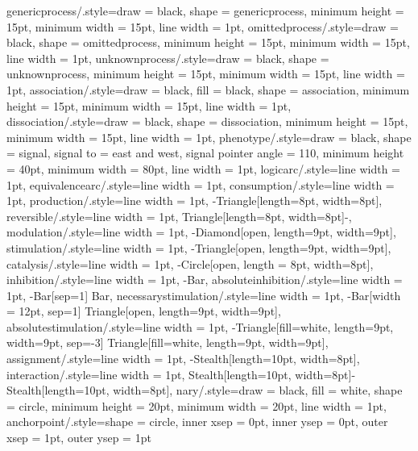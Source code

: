 {    genericprocess/.style={draw = black, shape = genericprocess, minimum height = 15pt, minimum width = 15pt, line width = 1pt},
    omittedprocess/.style={draw = black, shape = omittedprocess, minimum height = 15pt, minimum width = 15pt, line width = 1pt},
    unknownprocess/.style={draw = black, shape = unknownprocess, minimum height = 15pt, minimum width = 15pt, line width = 1pt},
    association/.style={draw = black, fill = black, shape = association, minimum height = 15pt, minimum width = 15pt, line width = 1pt},
    dissociation/.style={draw = black, shape = dissociation, minimum height = 15pt, minimum width = 15pt, line width = 1pt},
    phenotype/.style={draw = black, shape = signal, signal to = east and west, signal pointer angle = 110, minimum height = 40pt, minimum width = 80pt, line width = 1pt},
    logicarc/.style={line width = 1pt},
    equivalencearc/.style={line width = 1pt},
    consumption/.style={line width = 1pt},
    production/.style={line width = 1pt, -{Triangle[length=8pt, width=8pt]}},
    reversible/.style={line width = 1pt, {Triangle[length=8pt, width=8pt]}-},
    modulation/.style={line width = 1pt, -{Diamond[open, length=9pt, width=9pt]}},
    stimulation/.style={line width = 1pt, -{Triangle[open, length=9pt, width=9pt]}},
    catalysis/.style={line width = 1pt, -{Circle[open, length = 8pt, width=8pt]}},
    inhibition/.style={line width = 1pt, -{Bar}},
    absoluteinhibition/.style={line width = 1pt, -{Bar[sep=1] Bar}},
    necessarystimulation/.style={line width = 1pt, -{Bar[width = 12pt, sep=1] Triangle[open, length=9pt, width=9pt]}},
    absolutestimulation/.style={line width = 1pt, -{Triangle[fill=white, length=9pt, width=9pt, sep=-3] Triangle[fill=white, length=9pt, width=9pt]}},
    assignment/.style={line width = 1pt, -{Stealth[length=10pt, width=8pt]}},
    interaction/.style={line width = 1pt, {Stealth[length=10pt, width=8pt]}-{Stealth[length=10pt, width=8pt]}},
    nary/.style={draw = black, fill = white, shape = circle, minimum height = 20pt, minimum width = 20pt, line width = 1pt},
    anchorpoint/.style={shape = circle, inner xsep = 0pt, inner ysep = 0pt, outer xsep = 1pt, outer ysep = 1pt}}
